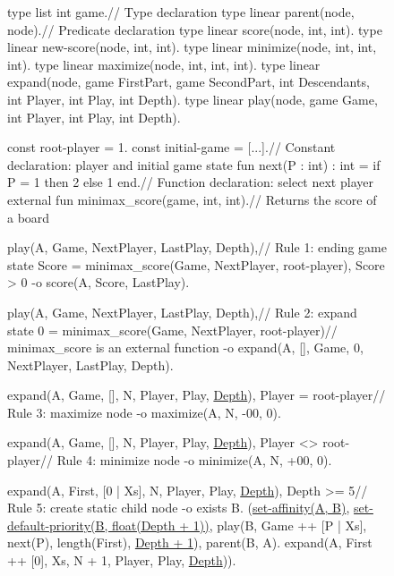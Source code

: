 \begin{figure}[]
\begin{LineCode}[commandchars=\\\{\},fontsize=\scriptsize]
type list int game.\hfill// Type declaration
type linear parent(node, node).\hfill// Predicate declaration
type linear score(node, int, int).
type linear new-score(node, int, int).
type linear minimize(node, int, int, int).
type linear maximize(node, int, int, int).
type linear expand(node, game FirstPart, game SecondPart, int Descendants, int Player, int Play, int Depth).
type linear play(node, game Game, int Player, int Play, int Depth).

const root-player = 1. const initial-game = [...].\hfill// Constant declaration: player and initial game state
fun next(P : int) : int = if P = 1 then 2 else 1 end.\hfill// Function declaration: select next player
external fun minimax_score(game, int, int).\hfill// Returns the score of a board

play(A, Game, NextPlayer, LastPlay, Depth),\label{line:coord:minimax_play1}\label{line:coord:minimax_play11}\hfill// Rule 1: ending game state
Score = minimax_score(Game, NextPlayer, root-player), Score > 0
   -o score(A, Score, LastPlay).\label{line:coord:minimax_play12}

play(A, Game, NextPlayer, LastPlay, Depth),\label{line:coord:minimax_play21}\hfill// Rule 2: expand state
0 = minimax_score(Game, NextPlayer, root-player)\hfill// minimax_score is an external function
   -o expand(A, [], Game, 0, NextPlayer, LastPlay, Depth).\label{line:coord:minimax_play2}\label{line:coord:minimax_play22}

expand(A, Game, [], N, Player, Play, \underline{Depth}), Player = root-player\label{line:coord:minimax_expand1}\label{line:coord:minimax_rule11}\hfill// Rule 3: maximize node
   -o maximize(A, N, -00, 0).\label{line:coord:minimax_rule12}

expand(A, Game, [], N, Player, Play, \underline{Depth}), Player <> root-player\label{line:coord:minimax_rule21}\hfill// Rule 4: minimize node
   -o minimize(A, N, +00, 0).\label{line:coord:minimax_rule22}

expand(A, First, [0 | Xs], N, Player, Play, \underline{Depth}), Depth >= 5\label{line:coord:minimax_rule31}\hfill// Rule 5: create static child node
   -o exists B. (\underline{set-affinity(A, B)},\label{line:coord:minimax_coord1}
       \underline{set-default-priority(B, float(Depth + 1))},\label{line:coord:minimax_coord2}
       play(B, Game ++ [P | Xs], next(P), length(First), \underline{Depth + 1}), parent(B, A).
       expand(A, First ++ [0], Xs, N + 1, Player, Play, \underline{Depth})).\label{line:coord:minimax_rule32}


\end{LineCode}
\end{figure}

